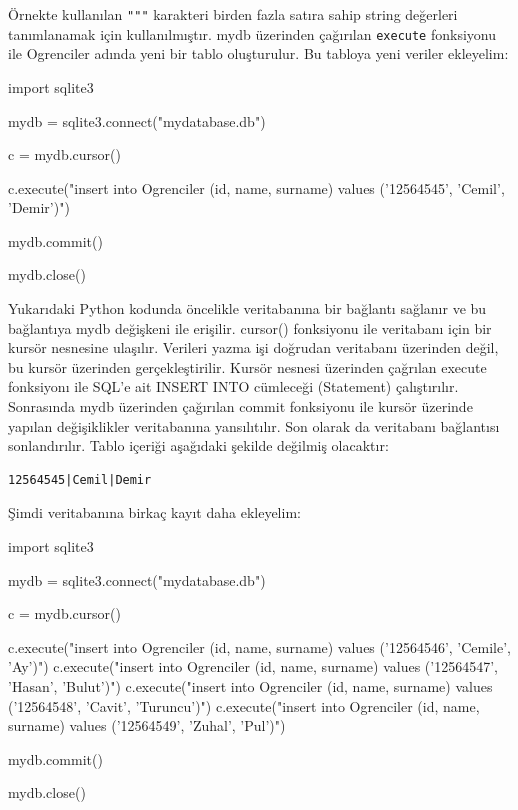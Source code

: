 \documentclass[12pt]{report}
\begin{document}
Örnekte kullanılan \texttt{"""} karakteri birden fazla satıra sahip string değerleri tanımlanamak için kullanılmıştır. mydb üzerinden çağırılan \texttt{execute} fonksiyonu ile Ogrenciler adında yeni bir tablo oluşturulur.  Bu tabloya yeni veriler ekleyelim:

\begin{python}
import sqlite3

mydb = sqlite3.connect("mydatabase.db")

c = mydb.cursor()

c.execute("insert into Ogrenciler (id, name, surname) values ('12564545', 'Cemil', 'Demir')")

mydb.commit()

mydb.close()
\end{python}

Yukarıdaki Python kodunda öncelikle veritabanına bir bağlantı sağlanır ve bu bağlantıya mydb değişkeni ile erişilir. cursor() fonksiyonu ile veritabanı için bir kursör nesnesine ulaşılır. Verileri yazma işi doğrudan veritabanı üzerinden değil, bu kursör üzerinden gerçekleştirilir. Kursör nesnesi üzerinden çağrılan execute fonksiyonı ile SQL'e ait INSERT INTO cümleceği (Statement) çalıştırılır. Sonrasında mydb üzerinden çağırılan commit fonksiyonu ile kursör üzerinde yapılan değişiklikler veritabanına yansılıtılır. Son olarak da veritabanı bağlantısı sonlandırılır. Tablo içeriği aşağıdaki şekilde değilmiş olacaktır:

\begin{verbatim}
12564545|Cemil|Demir
\end{verbatim}

Şimdi veritabanına birkaç kayıt daha ekleyelim:


\begin{python}
import sqlite3

mydb = sqlite3.connect("mydatabase.db")

c = mydb.cursor()

c.execute("insert into Ogrenciler (id, name, surname) values ('12564546', 'Cemile', 'Ay')")
c.execute("insert into Ogrenciler (id, name, surname) values ('12564547', 'Hasan', 'Bulut')")
c.execute("insert into Ogrenciler (id, name, surname) values ('12564548', 'Cavit', 'Turuncu')")
c.execute("insert into Ogrenciler (id, name, surname) values ('12564549', 'Zuhal', 'Pul')")

mydb.commit()

mydb.close()
\end{python}
\end{document}
